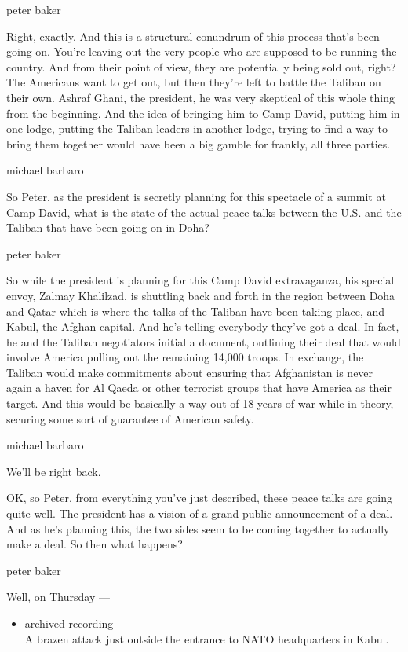 peter baker

Right, exactly. And this is a structural conundrum of this process
that's been going on. You're leaving out the very people who are
supposed to be running the country. And from their point of view, they
are potentially being sold out, right? The Americans want to get out,
but then they're left to battle the Taliban on their own. Ashraf Ghani,
the president, he was very skeptical of this whole thing from the
beginning. And the idea of bringing him to Camp David, putting him in
one lodge, putting the Taliban leaders in another lodge, trying to find
a way to bring them together would have been a big gamble for frankly,
all three parties.

michael barbaro

So Peter, as the president is secretly planning for this spectacle of a
summit at Camp David, what is the state of the actual peace talks
between the U.S. and the Taliban that have been going on in Doha?

peter baker

So while the president is planning for this Camp David extravaganza, his
special envoy, Zalmay Khalilzad, is shuttling back and forth in the
region between Doha and Qatar which is where the talks of the Taliban
have been taking place, and Kabul, the Afghan capital. And he's telling
everybody they've got a deal. In fact, he and the Taliban negotiators
initial a document, outlining their deal that would involve America
pulling out the remaining 14,000 troops. In exchange, the Taliban would
make commitments about ensuring that Afghanistan is never again a haven
for Al Qaeda or other terrorist groups that have America as their
target. And this would be basically a way out of 18 years of war while
in theory, securing some sort of guarantee of American safety.

michael barbaro

We'll be right back.

OK, so Peter, from everything you've just described, these peace talks
are going quite well. The president has a vision of a grand public
announcement of a deal. And as he's planning this, the two sides seem to
be coming together to actually make a deal. So then what happens?

peter baker

Well, on Thursday ---

\begin{itemize}
\tightlist
\item
  archived recording\\
  A brazen attack just outside the entrance to NATO headquarters in
  Kabul.
\end{itemize}

